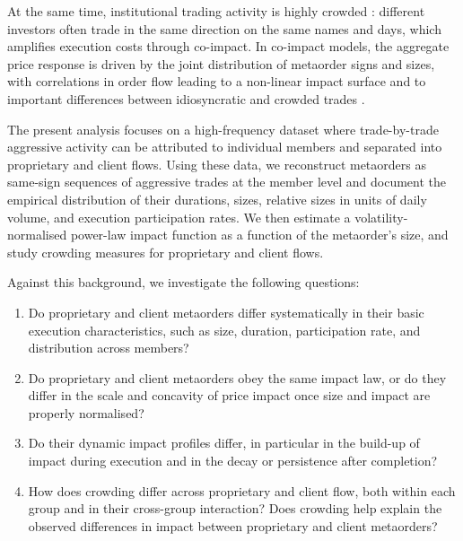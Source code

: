 \documentclass[11pt]{article}
\begin{document}
At the same time, institutional trading activity is highly crowded \cite{PuckettYan2008,Sias2004,DasguptaPratVerardo2011}:
different investors often trade in the same direction on the same names
and days, which amplifies execution costs through co-impact.
In co-impact models, the aggregate price response is driven by the joint
distribution of metaorder signs and sizes, with correlations in order
flow leading to a non-linear impact surface and to important differences
between idiosyncratic and crowded trades \cite{BucciEtAl2020, BriereEtAl2019}. 


The present analysis focuses on a high-frequency dataset where
trade-by-trade aggressive activity can be attributed to individual
members and separated into proprietary and client flows. Using these data, we 
reconstruct metaorders as same-sign sequences of aggressive trades at the member level and
document the empirical distribution of their durations, sizes, relative sizes in units of daily volume, and execution
participation rates. We then estimate a volatility-normalised power-law impact function as a function of the metaorder's 
size, and study crowding measures for proprietary and client flows.

Against this background, we investigate the following questions:

\begin{enumerate}
    \item Do proprietary and client metaorders differ systematically in their basic execution characteristics, such as size, duration, participation rate, and distribution across members?
    \item Do proprietary and client metaorders obey the same impact law, or do they differ in the scale and concavity of price impact once size and impact are properly normalised?
    \item Do their dynamic impact profiles differ, in particular in the build-up of impact during execution and in the decay or persistence after completion?
    \item How does crowding differ across proprietary and client flow, both within each group and in their cross-group interaction? Does crowding help explain the observed differences in impact between proprietary and client metaorders?
\end{enumerate}
\end{document}
